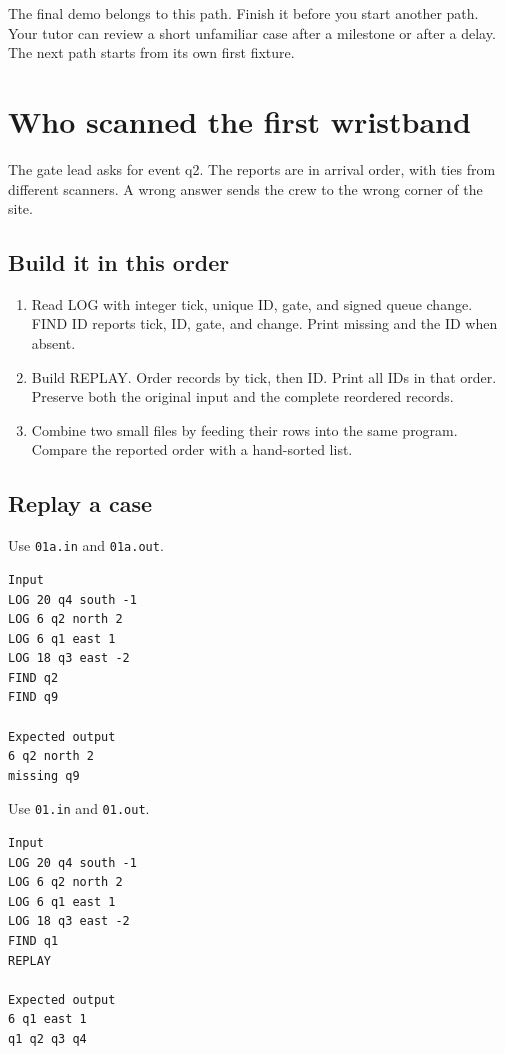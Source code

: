 \documentclass[11pt,letterpaper]{article}
\begin{document}
The final demo belongs to this path. Finish it before you start another path. Your tutor can review a short unfamiliar case after a milestone or after a delay. The next path starts from its own first fixture.

\clearpage

\section{Who scanned the first wristband}\label{festival:01}

The gate lead asks for event q2. The reports are in arrival order, with ties from different scanners. A wrong answer sends the crew to the wrong corner of the site.

\subsection*{Build it in this order}

\begin{enumerate}
\item Read LOG with integer tick, unique ID, gate, and signed queue change. FIND ID reports tick, ID, gate, and change. Print missing and the ID when absent.
\item Build REPLAY. Order records by tick, then ID. Print all IDs in that order. Preserve both the original input and the complete reordered records.
\item Combine two small files by feeding their rows into the same program. Compare the reported order with a hand-sorted list.
\end{enumerate}

\subsection*{Replay a case}

Use \texttt{01a.in} and \texttt{01a.out}.

\begin{samepage}
\small
\begin{verbatim}
Input
LOG 20 q4 south -1
LOG 6 q2 north 2
LOG 6 q1 east 1
LOG 18 q3 east -2
FIND q2
FIND q9

Expected output
6 q2 north 2
missing q9
\end{verbatim}
\end{samepage}

Use \texttt{01.in} and \texttt{01.out}.

\begin{samepage}
\small
\begin{verbatim}
Input
LOG 20 q4 south -1
LOG 6 q2 north 2
LOG 6 q1 east 1
LOG 18 q3 east -2
FIND q1
REPLAY

Expected output
6 q1 east 1
q1 q2 q3 q4
\end{verbatim}
\end{samepage}
\end{document}
